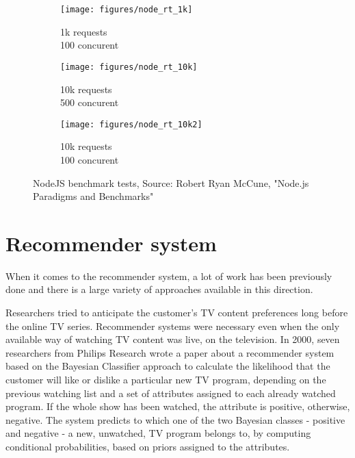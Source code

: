 \begin{figure}[h]
\centering
\captionsetup[subfigure]{justification=centering}
\begin{subfigure}[t]{0.32\textwidth}
    \texttt{[image: figures/node\_rt\_1k]} 
    \caption{1k requests\\[1ex]100 concurent}
    \label{fig:nodert1k}
\end{subfigure}
\begin{subfigure}[t]{0.32\textwidth}
    \texttt{[image: figures/node\_rt\_10k]}
    \caption{10k requests\\[1ex]500 concurent}
    \label{fig:nodert10k}
\end{subfigure}
\begin{subfigure}[t]{0.32\textwidth}
    \texttt{[image: figures/node\_rt\_10k2]}
    \caption{10k requests\\[1ex]100 concurent}
    \label{fig:nodert10k2}
\end{subfigure}

\caption{NodeJS benchmark tests, \newline Source: Robert Ryan McCune, "Node.js Paradigms and Benchmarks"}
\label{fig:nodert}
\end{figure}
\section{Recommender system}

When it comes to the recommender system, a lot of work has been previously done and there is a large variety of approaches available in this direction.

Researchers tried to anticipate the customer's TV content preferences long before the online TV series. Recommender systems were necessary even when the only available way of watching TV content was live, on the television. In 2000, seven researchers from Philips Research wrote a paper \cite{15} about a recommender system based on the Bayesian Classifier approach to calculate the likelihood that the customer will like or dislike a particular new TV program, depending on the previous watching list and a set of attributes assigned to each already watched program. If the whole show has been watched, the attribute is positive, otherwise, negative. The system predicts to which one of the two Bayesian classes - positive and negative - a new, unwatched, TV program belongs to, by computing conditional probabilities, based on priors assigned to the attributes.

